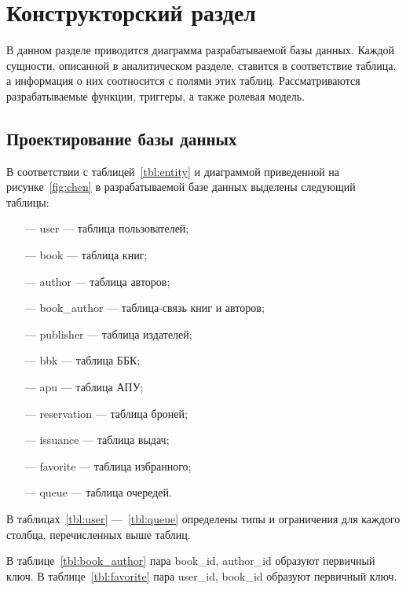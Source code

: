 \chapter{Конструкторский раздел}
В данном разделе приводится диаграмма разрабатываемой базы данных. Каждой сущности, описанной в аналитическом разделе, ставится в соответствие таблица, а информация о них соотносится с полями этих таблиц. Рассматриваются разрабатываемые функции, триггеры, а также ролевая модель.

\section{Проектирование базы данных}

В соответствии с таблицей~\ref{tbl:entity} и диаграммой приведенной на рисунке~\ref{fig:chen} в разрабатываемой базе данных выделены следующий таблицы:
\begin{itemize}
    \item[---] user --- таблица пользователей;
    \item[---] book --- таблица книг;
    \item[---] author --- таблица авторов;
    \item[---] book\_author --- таблица-связь книг и авторов;
    \item[---] publisher --- таблица издателей;
    \item[---] bbk --- таблица ББК;
    \item[---] apu --- таблица АПУ;
    \item[---] reservation --- таблица броней;
    \item[---] issuance --- таблица выдач;
    \item[---] favorite --- таблица избранного;
    \item[---] queue --- таблица очередей.
\end{itemize}

В таблицах~\ref{tbl:user} ---~\ref{tbl:queue} определены типы и ограничения для каждого столбца, перечисленных выше таблиц.

В таблице~\ref{tbl:book_author} пара book\_id, author\_id образуют первичный ключ. В таблице~\ref{tbl:favorite} пара user\_id, book\_id образуют первичный ключ.

